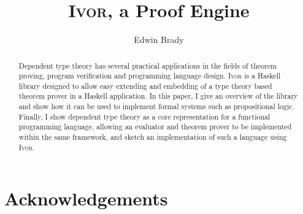 \documentclass[orivec,dvips,10pt]{llncs}
\newcommand{\Ivor}{\textsc{Ivor}}
\begin{document}
\title{\Ivor{}, a Proof Engine}
\author{Edwin Brady}

 
\maketitle

\begin{abstract}
Dependent type theory has several practical applications in the fields
of theorem proving, program verification and programming language
design. \Ivor{} is a Haskell library designed to allow easy extending
and embedding of a type theory based theorem prover in a Haskell
application. In this paper, I give an overview of the library and show
how it can be used to implement formal systems such as propositional
logic.  Finally, I show dependent type theory as a
core representation for a functional programming language, allowing an
evaluator and theorem prover to be implemented within the same
framework, and sketch an implementation of such a language using
\Ivor{}.

\end{abstract}





%







\section*{Acknowledgements}



\begin{small}


\appendix



\end{small}
\end{document}
